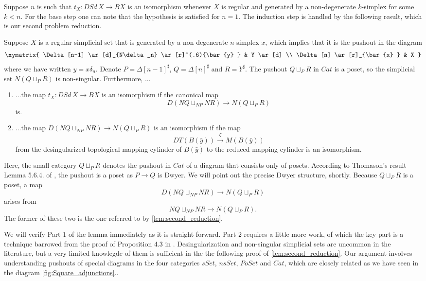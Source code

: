 Suppose $n$ is such that $t_X:DSd\, X\to BX$ is an isomorphism whenever $X$ is regular and generated by a non-degenerate $k$-simplex for some $k<n$. For the base step one can note that the hypothesis is satisfied for $n=1$. The induction step is handled by the following result, which is our second problem reduction.
\begin{lemma}\label{lem:second_reduction}
Suppose $X$ is a regular simplicial set that is generated by a non-degenerate $n$-simplex $x$, which implies that it is the pushout in the diagram
\begin{displaymath}
\xymatrix{
\Delta [n-1] \ar[d]_{N\delta _n} \ar[r]^(.6){\bar{y} } & Y \ar[d] \\
\Delta [n] \ar[r]_{\bar{x} } & X
}
\end{displaymath}
where we have written $y=x\delta _n$. Denote $P=\Delta [n-1]^\sharp$, $Q=\Delta [n]^\sharp$ and $R=Y^\sharp$. The pushout $Q\sqcup _PR$ in $Cat$ is a poset, so the simplicial set $N(Q\sqcup _PR)$ is non-singular. Furthermore, ...
\begin{enumerate}
\item{
...the map $t_X:DSd\, X\to BX$ is an isomorphism if the canonical map
\[D(NQ\sqcup _{NP}NR)\to N(Q\sqcup _PR)\]
is.
}
\item{
...the map $D(NQ\sqcup _{NP}NR)\to N(Q\sqcup _PR)$ is an isomorphism if the map
\[DT(B(\bar{y} ))\xrightarrow{\zeta } M(B(\bar{y} ))\]
from the desingularized topological mapping cylinder of $B(\bar{y} )$ to the reduced mapping cylinder is an isomorphism.
}
\end{enumerate}
\end{lemma}
\noindent Here, the small category $Q\sqcup _PR$ denotes the pushout in $Cat$ of a diagram that consists only of posets. According to Thomason's result Lemma 5.6.4. of \cite{Th80}, the pushout is a poset as $P\to Q$ is Dwyer. We will point out the precise Dwyer structure, shortly. Because $Q\sqcup _PR$ is a poset, a map 
\[D(NQ\sqcup _{NP}NR)\to N(Q\sqcup _PR)\]
arises from
\[NQ\sqcup _{NP}NR\to N(Q\sqcup _PR).\]
The former of these two is the one referred to by \cref{lem:second_reduction}.

We will verify Part $1$ of the lemma immediately as it is straight forward. Part $2$ requires a little more work, of which the key part is a technique barrowed from the proof of Proposition 4.3 in \cite{Th80}. Desingularization and non-singular simplicial sets are uncommon in the literature, but a very limited knowlegde of them is sufficient in the the following proof of \cref{lem:second_reduction}. Our argument involves understanding pushouts of special diagrams in the four categories $sSet$, $nsSet$, $PoSet$ and $Cat$, which are closely related as we have seen in the diagram \cref{fig:Square_adjunctions}..

